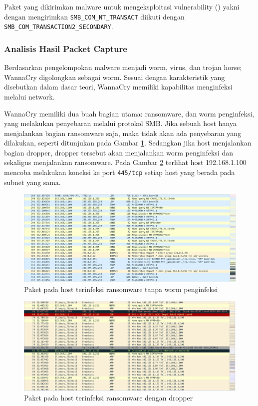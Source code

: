 Paket yang dikirimkan malware untuk mengeksploitasi vulnerability (\cite{islam2018smb}) yakni dengan mengirimkan \verb|SMB_COM_NT_TRANSACT|  diikuti dengan \verb|SMB_COM_TRANSACTION2_SECONDARY|.

\subsubsection{Analisis Hasil Packet Capture}

Berdasarkan pengelompokan malware menjadi worm, virus, dan trojan horse; WannaCry digolongkan sebagai worm. Sesuai dengan karakteristik yang disebutkan dalam dasar teori, WannaCry memiliki kapabilitas menginfeksi melalui network.

WannaCry memiliki dua buah bagian utama: ransomware, dan worm penginfeksi, yang melakukan penyebaran melalui protokol SMB. Jika sebuah host hanya menjalankan bagian ransomware saja, maka tidak akan ada penyebaran yang dilakukan, seperti ditunjukan pada Gambar \ref{fig:no_infect_action}. Sedangkan jika host menjalankan bagian dropper, dropper tersebut akan menjalankan worm penginfeksi dan sekaligus menjalankan ransomware. Pada Gambar \ref{fig:infect_action} terlihat host 192.168.1.100  mencoba melakukan koneksi ke port \verb|445/tcp| setiap host yang berada pada subnet yang sama.

\begin{figure}[H]
	\centering
	\includegraphics[width=\textwidth]{resources/no_infect_action.png}
	\caption{Paket pada host terinfeksi ransomware tanpa worm penginfeksi}
	\label{fig:no_infect_action}
\end{figure}

\begin{figure}[H]
	\centering
	\includegraphics[width=\textwidth]{resources/infect_action.png}
	\caption{Paket pada host terinfeksi ransomware dengan dropper}
	\label{fig:infect_action}
\end{figure}

